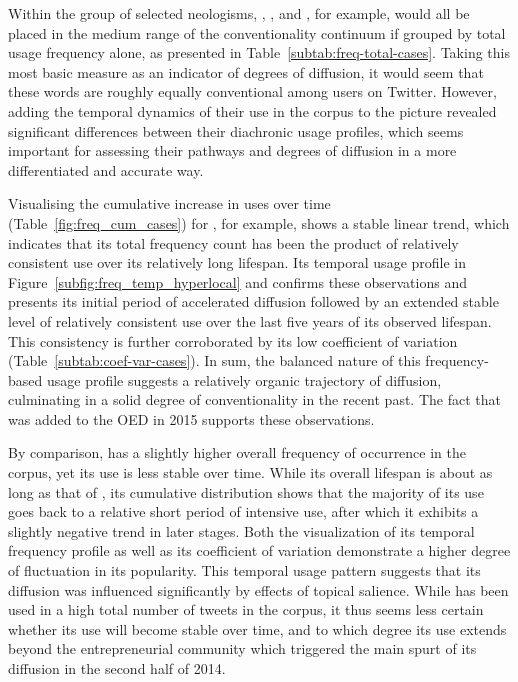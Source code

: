 \documentclass[
  a4paper,
  abstract=on,
  captions=tableabove
  ]{scrartcl}
\begin{document}
        Within the group of selected neologisms, , , and , for example, would all be placed in the medium range of the conventionality continuum if grouped by total usage frequency alone, as presented in Table~\ref{subtab:freq-total-cases}. Taking this most basic measure as an indicator of degrees of diffusion, it would seem that these words are roughly equally conventional among users on Twitter. However, adding the temporal dynamics of their use in the corpus to the picture revealed significant differences between their diachronic usage profiles, which seems important for assessing their pathways and degrees of diffusion in a more differentiated and accurate way.

        Visualising the cumulative increase in uses over time (Table~\ref{fig:freq_cum_cases}) for , for example, shows a stable linear trend, which indicates that its total frequency count has been the product of relatively consistent use over its relatively long lifespan. Its temporal usage profile in Figure~\ref{subfig:freq_temp_hyperlocal} and confirms these observations and presents its initial period of accelerated diffusion followed by an extended stable level of relatively consistent use over the last five years of its observed lifespan. This consistency is further corroborated by its low coefficient of variation (Table~\ref{subtab:coef-var-cases}). In sum, the balanced nature of this frequency-based usage profile suggests a relatively organic trajectory of diffusion, culminating in a solid degree of conventionality in the recent past. The fact that  was added to the OED in 2015 supports these observations.

        By comparison,  has a slightly higher overall frequency of occurrence in the corpus, yet its use is less stable over time. While its overall lifespan is about as long as that of , its cumulative distribution shows that the majority of its use goes back to a relative short period of intensive use, after which it exhibits a slightly negative trend in later stages. Both the visualization of its temporal frequency profile as well as its coefficient of variation demonstrate a higher degree of fluctuation in its popularity. This temporal usage pattern suggests that its diffusion was influenced significantly by effects of topical salience. While  has been used in a high total number of tweets in the corpus, it thus seems less certain whether its use will become stable over time, and to which degree its use extends beyond the entrepreneurial community which triggered the main spurt of its diffusion in the second half of 2014.
\end{document}
